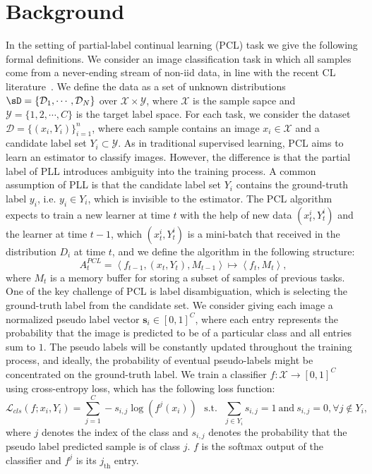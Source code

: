 \documentclass{article} %
\begin{document}
\section{Background}
In the setting of partial-label continual learning (PCL) task we give the following formal definitions. We consider an image classification task in which all samples come from a never-ending stream of non-iid data, in line with the recent CL literature~\citep{MIR, TimotheLesort2019ContinualLF, ZhedaMai2021OnlineCL}.
We define the data as a set of unknown distributions $\sD = \{\mathcal{D}_1, \cdots, \mathcal{D}_N \}$ over $\mathcal{X} \times \mathcal{Y}$, where $\mathcal{X}$ is the sample sapce and $\mathcal{Y} = \{1, 2, \cdots, C\}$ is the target label space.
For each task, we consider the dataset $\mathcal{D} = \{(x_i, Y_i)\}^n_{i=1}$, where each sample contains an image $x_i \in \mathcal{X}$ and a candidate label set $Y_i \subset \mathcal{Y}$.
As in traditional supervised learning, PCL aims to learn an estimator to classify images. However, the difference is that the partial label of PLL introduces ambiguity into the training process. 
A common assumption of PLL is that the candidate label set $Y_i$ contains the ground-truth label $y_i$, i.e. $y_i \in Y_i$, which is invisible to the estimator. 
The PCL algorithm expects to train a new learner at time $t$ with the help of new data $(x_t^i, Y_t^i)$ and the learner at time $t-1$, which $(x_t^i, Y_t^i)$ is a mini-batch that received in the distribution $D_i$ at time $t$, and we define the algorithm in the following structure:
\begin{equation}
A^{PCL}_t = \left<f_{t-1}, (x_t, Y_t), M_{t-1}\right> \mapsto \left< f_t, M_t\right>,
\end{equation}
where $M_{t}$ is a memory buffer for storing a subset of samples of previous tasks. One of the key challenge of PCL is label disambiguation, which is selecting the ground-truth label from the candidate set. 
We consider giving each image a normalized pseudo label vector $\boldsymbol{s}_i \in [0, 1]^C$, where each entry represents the probability that the image is predicted to be of a particular class and all entries sum to $1$.
The pseudo labels will be constantly updated throughout the training process, and ideally, the probability of eventual pseudo-labels might be concentrated on the ground-truth label. 
We train a classifier $f: \mathcal{X} \rightarrow [0, 1]^C$ using cross-entropy loss, which has the following loss function: 
\begin{equation}\label{eq1}
\mathcal{L}_{cls} (f; x_i, Y_i) = \sum^C_{j=1} -s_{i, j}\log(f^j(x_i)) ~~~\text{s.t.}~~~ \sum_{j\in Y_i} s_{i, j} = 1 ~ \text{and} ~ s_{i, j} = 0, \forall j \not\in Y_i,
\end{equation}
where $j$ denotes the index of the class and $s_{i,j}$ denotes the probability that the pseudo label predicted sample is of class $j$. $f$ is the softmax output of the classifier and $f^j$ is its $j_{\text{th}}$ entry. 
\end{document}

